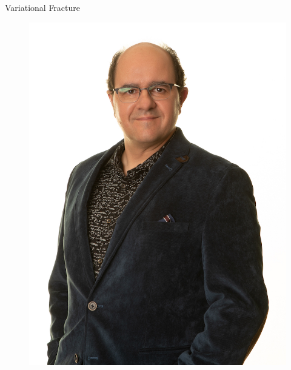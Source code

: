 \documentclass[aspectratio=169,xcolor=dvipsnames,11pt]{beamer}
\begin{document}
\begin{frame}{Variational Fracture}
\begin{minipage}{0.3\textwidth}
\begin{figure}
\begin{minipage}[b]{0.4\textwidth}
    \includegraphics[width=\linewidth]{figures/BlaiseBourdin_1024.jpg}
  \end{minipage}
\end{figure}
    \end{minipage}
\end{frame}
\end{document}
